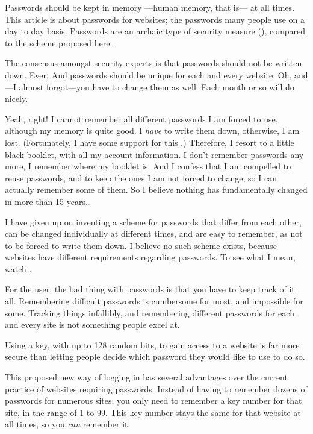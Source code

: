 Passwords should be kept in memory%
---human memory, that is---%
at all times.
This article is about passwords for websites; the passwords many people use on a day to day basis.
Passwords are an archaic type of security measure
(\cite{Honan2012}),
compared to the scheme proposed here.

The consensus amongst security experts is that passwords should not be written down.
Ever.
And passwords should be unique for each and every website.
Oh, and---I almost forgot---you have to change them as well.
Each month or so will do nicely. 
\par
Yeah, right!
I cannot remember all different passwords I am forced to use, although my memory is quite good.
I \emph{have} to write them down,
	otherwise,
		I am lost.
(Fortunately,
	I have some support for this \cite{Schneier:2005}.)
Therefore,
	I resort to a little black booklet,
		with all my account information.
I don't remember passwords any more,
	I remember where my booklet is.
And I confess that I am compelled to reuse passwords,
	and to keep the ones I am not forced to change,
		so I can actually remember some of them.
So I believe nothing has fundamentally changed in more than 15 years\ldots\cite{Adams:1999:UE:322796.322806}
\par
I have given up on inventing a scheme for passwords that differ from each other,
can be changed individually at different times, 
and are easy to remember, as not to be forced to write them down.
I believe no such scheme exists, because websites have different requirements regarding passwords.
To see what I mean, watch \cite{youtube:tobyturner}.
\par
For the user, the bad thing with passwords is that you have to keep track of it all.
Remembering difficult passwords is cumbersome for most, and impossible for some.
Tracking things infallibly, and remembering different passwords for each and every site is not something people excel at.

Using a key,
with up to 128 random bits,
to gain access to a website is far more secure than letting people decide which password they would like to use to do so.
\par
This proposed new way of logging in has several advantages over the current practice of websites requiring passwords.
Instead of having to remember dozens of passwords for numerous sites,
you only need to remember a key number for that site, in the range of 1 to 99.
This key number stays the same for that website at all times, so you \emph{can} remember it.


